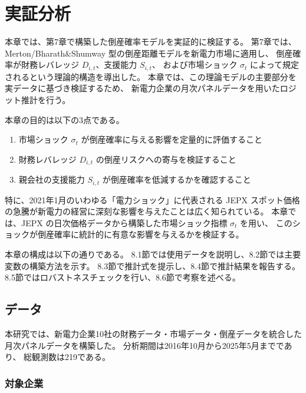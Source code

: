 
\chapter{実証分析}
\label{chap:empirical}

本章では、第7章で構築した倒産確率モデルを実証的に検証する。
第7章では、Merton/Bharath\&Shumway 型の倒産距離モデルを新電力市場に適用し、
倒産確率が財務レバレッジ $D_{i,t}$、支援能力 $S_{i,t}$、
および市場ショック $\sigma_t$ によって規定されるという理論的構造を導出した。
本章では、この理論モデルの主要部分を実データに基づき検証するため、
新電力企業の月次パネルデータを用いたロジット推計を行う。

本章の目的は以下の3点である。

\begin{enumerate}
  \item 市場ショック $\sigma_t$ が倒産確率に与える影響を定量的に評価すること
  \item 財務レバレッジ $D_{i,t}$ の倒産リスクへの寄与を検証すること
  \item 親会社の支援能力 $S_{i,t}$ が倒産確率を低減するかを確認すること
\end{enumerate}

特に、2021年1月のいわゆる「電力ショック」に代表される
JEPX スポット価格の急騰が新電力の経営に深刻な影響を与えたことは広く知られている。
本章では、JEPX の日次価格データから構築した市場ショック指標 $\sigma_t$ を用い、
このショックが倒産確率に統計的に有意な影響を与えるかを検証する。

本章の構成は以下の通りである。
8.1節では使用データを説明し、8.2節では主要変数の構築方法を示す。
8.3節で推計式を提示し、8.4節で推計結果を報告する。
8.5節ではロバストネスチェックを行い、8.6節で考察を述べる。

\section{データ}
\label{sec:data}

本研究では、新電力企業10社の財務データ・市場データ・倒産データを統合した
月次パネルデータを構築した。
分析期間は2016年10月から2025年5月までであり、
総観測数は219である。

\subsection{対象企業}

